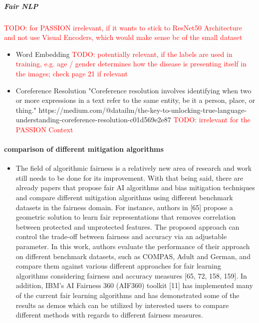 \documentclass[12pt, a4paper, oneside]{book}   	%
\renewcommand{\todo}[1]{\textcolor{red}{TODO: #1}}
\begin{document}
			\subparagraph{Fair NLP}
				\todo{for PASSION irrelevant, if it wants to stick to ResNet50 Architecture \autocite{Gottfrois2024} and not use Visual Encoders, which would make sense bc of the small dataset}
				\begin{itemize}
					\item Word Embedding \todo{potentially relevant, if the labels are used in training, e.g. age / gender determines how the disease is presenting itself in the images; check \autocite{Mehrabi_2021} page 21 if relevant}
					\item Coreference Resolution "Coreference resolution involves identifying when two or more expressions in a text refer to the same entity, be it a person, place, or thing." https://medium.com/@datailm/the-key-to-unlocking-true-language-understanding-coreference-resolution-c01d569e2e87 \todo{irrelevant for the PASSION Context}
				\end{itemize}
				
			\paragraph{comparison of different mitigation algorithms}
				\begin{itemize}
					\item The field of algorithmic fairness is a relatively new area of research and work still needs to be done for its improvement. With that being said, there are already papers that propose fair AI algorithms and bias mitigation techniques and compare different mitigation algorithms using different benchmark datasets in the fairness domain. For instance, authors in [65] propose a geometric solution to learn fair representations that removes correlation between protected and unprotected features. The proposed approach can control the trade-off between fairness and accuracy via an adjustable parameter. In this work, authors evaluate the performance of their approach on different benchmark datasets, such as COMPAS, Adult and German, and compare them against various different approaches for fair learning algorithms considering fairness and accuracy measures [65, 72, 158, 159]. In addition, IBM’s AI Fairness 360 (AIF360) toolkit [11] has implemented many of the current fair learning algorithms and has demonstrated some of the results as demos which can be utilized by interested users to compare different methods with regards to different fairness measures. \autocite{Mehrabi_2021}
				\end{itemize}			
			
\end{document}
